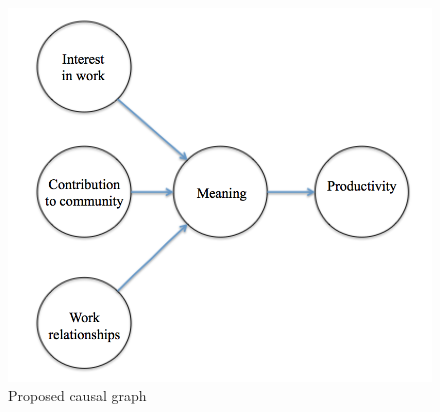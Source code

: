 \documentclass[12pt]{article}
\begin{document}
\begin{figure} [!h]
\centering
\includegraphics[scale=0.75]{causal_diagram}
\caption{Proposed causal graph}
\end{figure}
\end{document}
